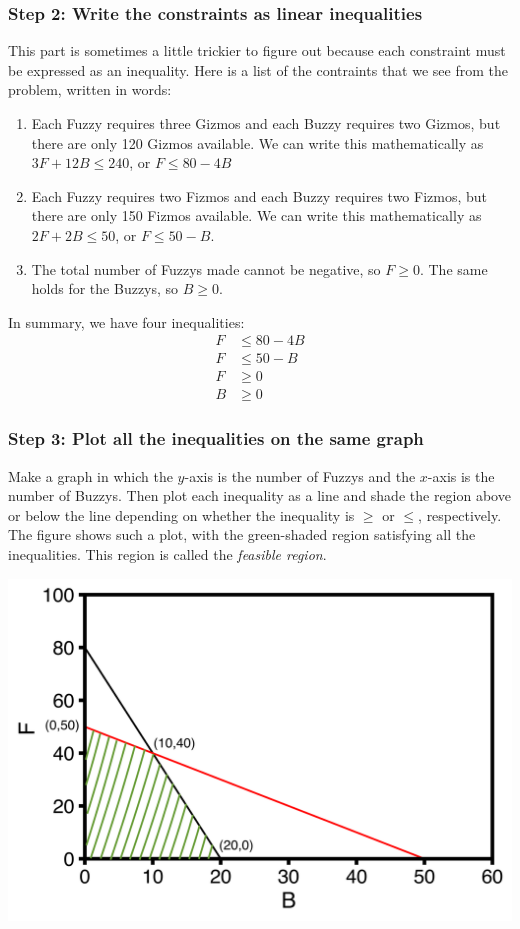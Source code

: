 \documentclass{article}
\begin{document}
\subsubsection*{Step 2: Write the constraints as linear inequalities}
This part is sometimes a little trickier to figure out because each constraint must
be expressed as an inequality.
Here is a list of the contraints that we see from the problem, written in words:
\begin{enumerate}
     \item Each Fuzzy requires three Gizmos and each Buzzy requires two
         Gizmos, but there are only 120 Gizmos available.  We can write this
         mathematically as $3F + 12 B \le 240$, or $F \le 80 - 4B$
     \item Each Fuzzy requires two Fizmos and each Buzzy requires two
         Fizmos, but there are only 150 Fizmos available.  We can write this
         mathematically as $2F + 2B \le 50$, or $F \le 50 - B$.
      \item The total number of Fuzzys made cannot be negative, so $F \ge 0$.
         The same holds for the Buzzys, so $B \ge 0$.
\end{enumerate}
In summary, we have four inequalities:
\begin{align}
F &\le 80 - 4 B \\
F &\le 50 - B \\ 
F &\ge 0 \\
B &\ge 0 
\end{align}

\subsubsection*{Step 3: Plot all the inequalities on the same graph}
Make a graph in which the $y$-axis is the number of Fuzzys and the $x$-axis
is the number of Buzzys.  Then plot each inequality as a line and shade the
region above or below the line depending on whether the inequality is
$\ge$ or $\le$, respectively.  The figure shows such a plot, with the
green-shaded region satisfying all the inequalities.  This region is
called the \textit{feasible region}.

\begin{center}
    \includegraphics[scale=0.6]{FuzzyBuzzy.png}
\end{center}
\end{document}
